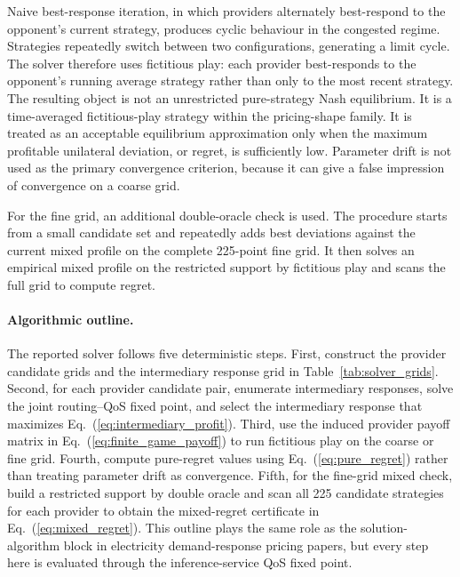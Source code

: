 \documentclass[11pt,a4paper]{article}
\begin{document}
Naive best-response iteration, in which providers alternately best-respond to the opponent's current strategy, produces cyclic behaviour in the congested regime. Strategies repeatedly switch between two configurations, generating a limit cycle. The solver therefore uses fictitious play: each provider best-responds to the opponent's running average strategy rather than only to the most recent strategy. The resulting object is not an unrestricted pure-strategy Nash equilibrium. It is a time-averaged fictitious-play strategy within the pricing-shape family. It is treated as an acceptable equilibrium approximation only when the maximum profitable unilateral deviation, or regret, is sufficiently low. Parameter drift is not used as the primary convergence criterion, because it can give a false impression of convergence on a coarse grid.

For the fine grid, an additional double-oracle check is used. The procedure starts from a small candidate set and repeatedly adds best deviations against the current mixed profile on the complete 225-point fine grid. It then solves an empirical mixed profile on the restricted support by fictitious play and scans the full grid to compute regret.

\paragraph{Algorithmic outline.}
The reported solver follows five deterministic steps. First, construct the provider candidate grids and the intermediary response grid in Table~\ref{tab:solver_grids}. Second, for each provider candidate pair, enumerate intermediary responses, solve the joint routing--QoS fixed point, and select the intermediary response that maximizes Eq.~(\ref{eq:intermediary_profit}). Third, use the induced provider payoff matrix in Eq.~(\ref{eq:finite_game_payoff}) to run fictitious play on the coarse or fine grid. Fourth, compute pure-regret values using Eq.~(\ref{eq:pure_regret}) rather than treating parameter drift as convergence. Fifth, for the fine-grid mixed check, build a restricted support by double oracle and scan all 225 candidate strategies for each provider to obtain the mixed-regret certificate in Eq.~(\ref{eq:mixed_regret}). This outline plays the same role as the solution-algorithm block in electricity demand-response pricing papers, but every step here is evaluated through the inference-service QoS fixed point.
\end{document}
